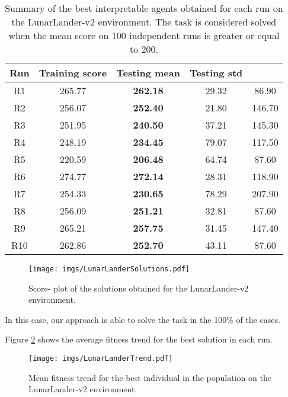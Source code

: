 \documentclass[review,english]{elsarticle}
\begin{document}
\begin{table}[ht!]
\centering
    \begin{tabular}{|c|c|c|c|c|} \hline
    \textbf{Run} & \textbf{Training score} & \textbf{Testing mean} & \textbf{Testing std} & \textbf{} \\ \hline
         R1 & 265.77 & \textbf{262.18} & 29.32 & 86.90 \\ R2 & 256.07 & \textbf{252.40} & 21.80 & 146.70 \\ R3 & 251.95 & \textbf{240.50} & 37.21 & 145.30 \\ R4 & 248.19 & \textbf{234.45} & 79.07 & 117.50 \\ R5 & 220.59 & \textbf{206.48} & 64.74 & 87.60 \\ R6 & 274.77 & \textbf{272.14} & 28.31 & 118.90 \\ R7 & 254.33 & \textbf{230.65} & 78.29 & 207.90 \\ R8 & 256.09 & \textbf{251.21} & 32.81 & 87.60 \\ R9 & 265.21 & \textbf{257.75} & 31.45 & 147.40 \\ R10 & 262.86 & \textbf{252.70} & 43.11 & 87.60 \\ \hline
    \end{tabular}
    \caption{Summary of the best interpretable agents obtained for each run on the LunarLander-v2 environment.
    The task is considered solved when the mean score on 100 independent runs is greater or equal to 200.}
    \label{tab:ll_obl_results}
\end{table}

\begin{figure}[ht!]
    \centering
    \texttt{[image: imgs/LunarLanderSolutions.pdf]}
    \caption{Score- plot of the solutions obtained for the LunarLander-v2 environment.}
    \label{fig:ll_solutions}
\end{figure}

In this case, our approach is able to solve the task in the 100\% of the cases. 

Figure \ref{fig:ll_obl_fitnesstrend} shows the average fitness trend for the best solution in each run.

\begin{figure}
    \centering
    \texttt{[image: imgs/LunarLanderTrend.pdf]}
    \caption{Mean fitness trend for the best individual in the population on the LunarLander-v2 environment.}
    \label{fig:ll_obl_fitnesstrend}
\end{figure}
\end{document}
